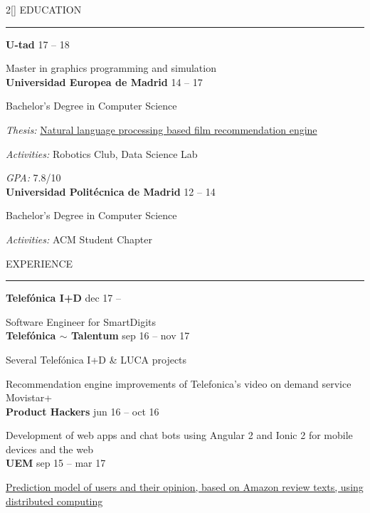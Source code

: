 \documentclass[a4paper, 12pt]{article}
\newenvironment{myparacol}[2][]{%
\begin{paracol}{#2}[#1]\setlength{\parindent}{0pt}}{%
\end{paracol}}
\begin{document}
\setlength{\columnsep}{24pt}
\begin{sloppypar}
\begin{myparacol}{2}
    EDUCATION
    \vspace{1mm}
    \hrule
    \kern9pt
    \textbf{U-tad} \hfill 17 -- 18

    Master in graphics programming and simulation\\

    \textbf{Universidad Europea de Madrid} \hfill 14 -- 17

    Bachelor's Degree in Computer Science

    \textit{Thesis:} \href{https://github.com/hugo19941994/movie-pepper-doc/raw/master/thesis.pdf}{Natural language processing based film recommendation engine}

    \textit{Activities:} Robotics Club, Data Science Lab

    \textit{GPA:} 7.8/10\\

    \textbf{Universidad Politécnica de Madrid} \hfill 12 -- 14

    Bachelor's Degree in Computer Science

    \textit{Activities:} ACM Student Chapter
    \\

    \switchcolumn

    EXPERIENCE
    \vspace{1mm}
    \hrule
    \kern9pt

    \textbf{Telefónica I+D} \hfill dec 17 --

    Software Engineer for SmartDigits\\

    \textbf{Telefónica $\sim$ Talentum} \hfill sep 16 -- nov 17

    Several Telefónica I+D \& LUCA projects

    Recommendation engine improvements of Telefonica's video on demand service Movistar+\\

    \textbf{Product Hackers} \hfill jun 16 -- oct 16

    Development of web apps and chat bots using Angular 2 and Ionic 2 for mobile devices and the web\\

    \textbf{UEM} \hfill sep 15 -- mar 17

    \href{https://www.researchgate.net/publication/314142014_Prediction_of_User_Opinion_for_Products_-_A_Bag-of-Words_and_Collaborative_Filtering_based_Approach}{Prediction model of users and their opinion, based on Amazon review texts, using distributed computing}


\end{myparacol}
\end{sloppypar}
\end{document}
